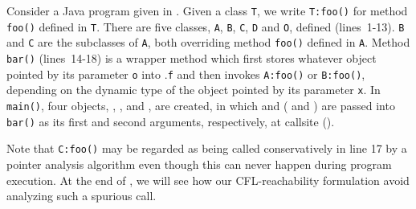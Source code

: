 Consider a Java program given in .
Given a class \texttt{T}, we write \texttt{T:foo()} for  method \texttt{foo()} defined in \texttt{T}.
There are five classes, 
\texttt{A}, \texttt{B}, \texttt{C}, \texttt{D} and \texttt{O}, defined (lines~1-13). \texttt{B} and \texttt{C} are the subclasses of \texttt{A}, both overriding method \texttt{foo()} defined in \texttt{A}. 
Method \texttt{bar()} (lines~14-18) is a wrapper method which first stores whatever object pointed by its parameter \texttt{o} into  .\texttt{f} and then invokes  \texttt{A:foo()} or \texttt{B:foo()}, depending on the dynamic type of the
object pointed by its parameter \texttt{x}. In \texttt{main()}, four objects, , ,  and , are created, in which  and  ( and ) are passed into \texttt{bar()} as its first and  second arguments,  respectively, at  callsite  ().

Note that \texttt{C:foo()} may be regarded as being called conservatively in line 17 by
a pointer analysis algorithm
even though this can never happen during program execution.
At the end of , we will see how our CFL-reachability formulation
\LFCR avoid analyzing such a spurious call.

